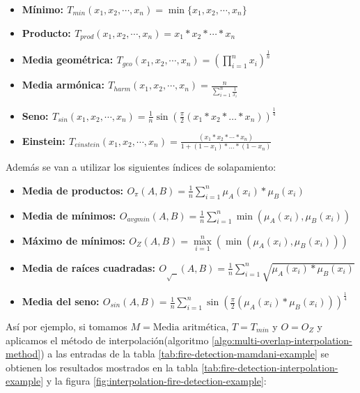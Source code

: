 \begin{itemize}
	\item \bfseries Mínimo: $T_{min}(x_{1},x_{2},\cdots,x_{n}) = \min\{x_{1},x_{2},\cdots,x_{n}\}$
	\item \bfseries Producto: $T_{prod}(x_{1},x_{2},\cdots,x_{n}) = x_{1}*x_{2} * \cdots * x_{n}$
	\item \bfseries Media geométrica: $T_{geo}(x_{1},x_{2},\cdots,x_{n}) = (\prod\limits_{i=1}^{n}x_{i})^{\frac{1}{n}}$
	\item \bfseries Media armónica: $T_{harm}(x_{1},x_{2},\cdots,x_{n}) = \frac{n}{\sum_{i=1}^{n}\frac{1}{x_i}}$
	\item \bfseries Seno: $T_{sin}(x_{1},x_{2},\cdots,x_{n}) = \frac{1}{n}\sin(\frac{\pi}{2}(x_1 * x_2 * \ldots * x_n))^{\frac{1}{4}}$
	\item \bfseries Einstein: $T_{einstein}(x_{1},x_{2},\cdots,x_{n}) = \frac{(x_{1}*x_{2} * \cdots * x_{n})}{1 + (1 - x_{1} )* \ldots * (1 - x_{n} )}$
\end{itemize}

Además se van a utilizar los siguientes índices de solapamiento:

\begin{itemize}
	\item \bfseries Media de productos: $O_{\pi}(A,B) = \frac{1}{n}\sum_{i=1}^{n}\mu_A(x_i)*\mu_B(x_i)$
	\item \bfseries Media de mínimos: $O_{avgmin}(A,B) = \frac{1}{n}\sum_{i=1}^{n}\min(\mu_A(x_i),\mu_B(x_i))$
	\item \bfseries Máximo de mínimos: $O_{Z}(A,B) = \max\limits_{i=1}^{n}(\min(\mu_A(x_i),\mu_B(x_i)))$
	\item \bfseries Media de raíces cuadradas: $O_{\sqrt{\text{ }}}(A,B) =  \frac{1}{n}\sum_{i=1}^{n}\sqrt{\mu_A(x_i)*\mu_B(x_i)}$
	\item \bfseries Media del seno:  $O_{sin}(A, B) = \frac{1}{n}\sum_{i=1}^{n}\sin(\frac{\pi}{2}(\mu_A(x_i)*\mu_B(x_i)))^{\frac{1}{4}}$
\end{itemize}

Así por ejemplo, si tomamos $M = \text{Media aritmética}$, $T = T_{min}$ y $O = O_Z$ y aplicamos el método de interpolación(algoritmo \ref{algo:multi-overlap-interpolation-method}) a las entradas de la tabla \ref{tab:fire-detection-mamdani-example} se obtienen los resultados mostrados en la tabla \ref{tab:fire-detection-interpolation-example} y la figura \ref{fig:interpolation-fire-detection-example}:


